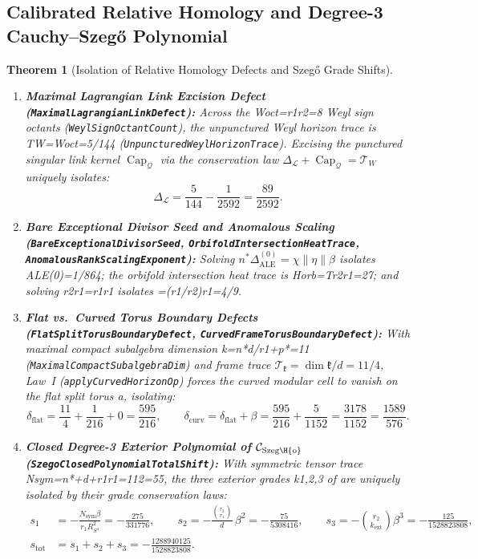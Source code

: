 \documentclass[11pt,reqno]{amsart}
\newtheorem{theorem}{Theorem}[section]
\theoremstyle{definition}
\theoremstyle{remark}
\newcommand{\CapQ}{\operatorname{Cap}_{\mathcal{Q}}}
\begin{document}
\subsection{Calibrated Relative Homology and Degree-3 Cauchy--Szeg\H{o} Polynomial}

\begin{theorem}[Isolation of Relative Homology Defects and Szeg\H{o} Grade Shifts]
\label{thm:homology_szego}
\begin{enumerate}[label=(\roman*)]
  \item \textbf{Maximal Lagrangian Link Excision Defect (\texttt{MaximalLagrangianLinkDefect}):} Across the Woct=r1r2=8 Weyl sign octants (\texttt{WeylSignOctantCount}), the unpunctured Weyl horizon trace is TW=Woct=5/144 (\texttt{UnpuncturedWeylHorizonTrace}). Excising the punctured singular link kernel $\CapQ$ via the conservation law $\Delta_{\mathcal{L}} + \CapQ = \mathcal{T}_W$ uniquely isolates:
  \begin{equation}
    \Delta_{\mathcal{L}} = \frac{5}{144} - \frac{1}{2592} = \frac{89}{2592}.
  \end{equation}
  \item \textbf{Bare Exceptional Divisor Seed and Anomalous Scaling (\texttt{BareExceptionalDivisorSeed}, \texttt{OrbifoldIntersectionHeatTrace}, \texttt{AnomalousRankScalingExponent}):} Solving $n^* \Delta_{\mathrm{ALE}}^{(0)} = \chi \|\eta\| \beta$ isolates ALE(0)=1/864; the orbifold intersection heat trace is Horb=Tr2r1=27; and solving r2r1=r1r1 isolates =(r1/r2)r1=4/9.
  \item \textbf{Flat vs.\ Curved Torus Boundary Defects (\texttt{FlatSplitTorusBoundaryDefect}, \texttt{CurvedFrameTorusBoundaryDefect}):} With maximal compact subalgebra dimension k=n*d/r1+p*=11 (\texttt{MaximalCompactSubalgebraDim}) and frame trace $\mathcal{T}_{\mathfrak{k}} = \dim\mathfrak{k}/d = 11/4$, Law~I (\texttt{applyCurvedHorizonOp}) forces the curved modular cell  to vanish on the flat split torus a, isolating:
  \begin{equation}
    \delta_{\mathrm{flat}} = \frac{11}{4} + \frac{1}{216} + 0 = \frac{595}{216}, \qquad
    \delta_{\mathrm{curv}} = \delta_{\mathrm{flat}} + \beta = \frac{595}{216} + \frac{5}{1152} = \frac{3178}{1152} = \frac{1589}{576}.
  \end{equation}
  \item \textbf{Closed Degree-3 Exterior Polynomial of $\mathcal{C}_{\mathrm{Szeg\H{o}}}$ (\texttt{SzegoClosedPolynomialTotalShift}):} With symmetric tensor trace Nsym=n*+d+r1r1=112=55, the three exterior grades k{1,2,3} of  are uniquely isolated by their grade conservation laws:
  \begin{align}
    s_1 &= -\frac{N_{\mathrm{sym}} \beta}{r_1 R_{S^4}^2} = -\frac{275}{331776}, \qquad
    s_2 = -\frac{\binom{r_2}{r_1}}{d}\,\beta^2 = -\frac{75}{5308416}, \qquad
    s_3 = -\binom{r_2}{k_{\mathrm{ext}}}\beta^3 = -\frac{125}{1528823808}, \nonumber\\
    s_{\mathrm{tot}} &= s_1 + s_2 + s_3 = -\frac{1288940125}{1528823808}.
  \end{align}
\end{enumerate}
\end{theorem}
\end{document}

